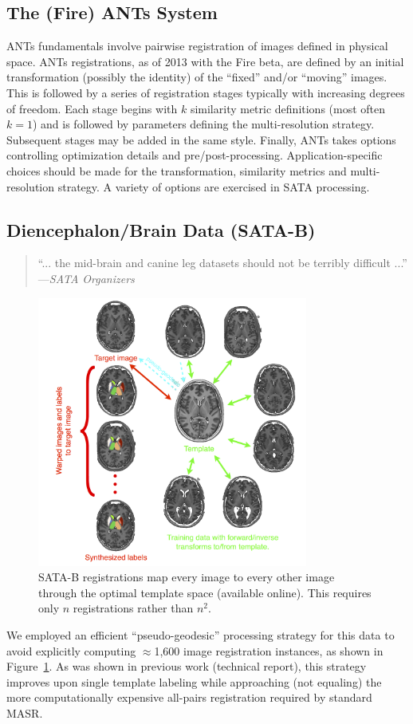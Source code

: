 \documentclass{llncs}
\begin{document}
\subsection{The (Fire) ANTs System} ANTs fundamentals involve pairwise
registration of images defined in physical space.  ANTs registrations,
as of 2013 with the Fire beta, are defined by an initial transformation (possibly the
identity) of the ``fixed'' and/or ``moving'' images.  This is followed
by a series of registration stages typically with increasing degrees
of freedom.  Each stage begins with $k$ similarity metric definitions
(most often $k=1$) and is followed by parameters defining the
multi-resolution strategy.  Subsequent stages may be added in the same
style.  Finally, ANTs takes options controlling optimization details
and pre/post-processing.  Application-specific choices should be made
for the transformation, similarity metrics and multi-resolution
strategy.  A variety of options are exercised in SATA processing.

\subsection{Diencephalon/Brain Data (SATA-B)}
 \begin{quote}
 ``... the mid-brain and canine leg
  datasets should not be terribly difficult ...'' ---{\em SATA Organizers}
\end{quote}
\begin{figure}[t]
 \centering 
  \includegraphics[width=3.5in]{../figs/SATA_diencephalon.png}
 \caption{SATA-B registrations map every image to every other image
   through the optimal template space (available online).  This
   requires only $n$ registrations rather than $n^2$.}
 \label{fig:Bmethods}
\end{figure}
We employed an efficient ``pseudo-geodesic'' processing strategy for this data to
avoid explicitly computing $\approx$1,600 image registration
instances, as shown in Figure~\ref{fig:Bmethods}.  As was shown in previous work (technical report), this
strategy improves upon single template labeling while approaching (not
equaling) the more computationally expensive all-pairs
registration required by standard MASR.
\end{document}
